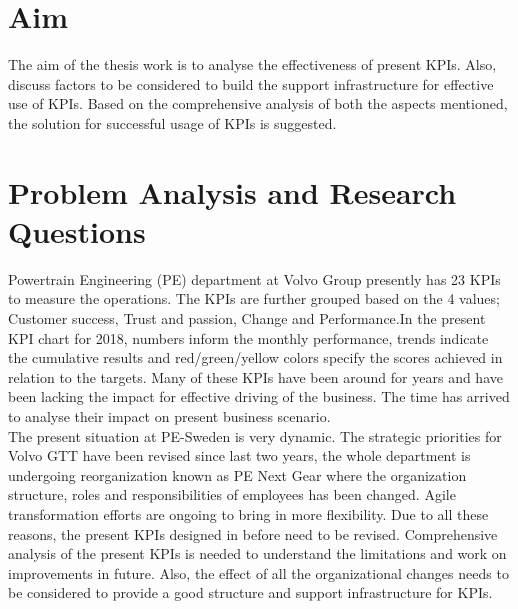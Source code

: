 
\section{Aim}
The aim of the thesis work is to analyse the effectiveness of present KPIs.  Also, discuss factors to be considered to build the support infrastructure for effective use of KPIs. Based on the comprehensive analysis of both the aspects mentioned, the solution for successful usage of KPIs is suggested.\\
\section{Problem Analysis and Research Questions}
Powertrain Engineering (PE) department at Volvo Group presently has 23 KPIs to measure the operations. The KPIs are further grouped based on the 4 values; Customer success, Trust and passion, Change and Performance.In the present KPI chart for 2018, numbers inform the monthly performance, trends indicate the cumulative results and red/green/yellow colors specify the scores achieved in relation to the targets. Many of these KPIs have been around for years and have been lacking the impact for effective driving of the business. The time has arrived to analyse their impact on present business scenario.\\

The present situation at PE-Sweden is very dynamic. The strategic priorities for Volvo GTT have been revised since last two years, the whole department is undergoing reorganization known as PE Next Gear where the organization structure, roles and responsibilities of employees has been changed. Agile transformation efforts are ongoing to bring in more flexibility. Due to all these reasons, the present KPIs designed in before need to be revised. Comprehensive analysis of the present KPIs is needed to understand the limitations and work on improvements in future. Also, the effect of all the organizational changes needs to be considered to provide a good structure and support infrastructure for KPIs.\\


